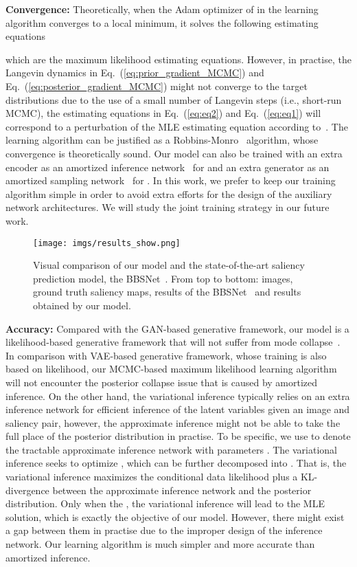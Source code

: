 \documentclass{article}
\begin{document}
\noindent\textbf{Convergence:} Theoretically, when the Adam optimizer of  in the learning algorithm converges to a local minimum, it solves the following estimating equations

which are the maximum likelihood estimating equations. However, in practise, the Langevin dynamics in Eq.~(\ref{eq:prior_gradient_MCMC}) and Eq.~(\ref{eq:posterior_gradient_MCMC}) might not converge to the target distributions due to the use of a small number of Langevin steps (i.e., short-run MCMC), the estimating equations in Eq.~(\ref{eq:eq2}) and Eq.~(\ref{eq:eq1}) will correspond to a perturbation of the MLE estimating equation according to~\cite{nijkamp2019learning,nijkamp2020learning,ebm_prior}. The learning algorithm can be justified as a Robbins-Monro~\cite{robbins1951stochastic} algorithm, whose convergence is theoretically sound. Our model can also be trained with an extra encoder as an amortized inference network~\cite{vae_bayes_kumar} for   and an extra generator as an amortized sampling network~\cite{XieLGW18,xie2018cooperative,XieZL21} for  . In this work, we prefer to keep our training algorithm simple in order to avoid extra efforts for the design of the auxiliary network architectures. We will study the joint training strategy in our future work.

 \begin{figure*}[t]
   \begin{center}
   \texttt{[image: imgs/results\_show.png]}
   \end{center}
   \caption{Visual comparison of our  model and the state-of-the-art saliency prediction model, the BBSNet~\cite{fan2020bbs}. From top to bottom: images, ground truth saliency maps, results of the BBSNet~\cite{fan2020bbs} and results obtained by our model.
   }\label{fig:visual_comparison}
\end{figure*}

\noindent\textbf{Accuracy:} Compared with the GAN-based generative framework, our model is a likelihood-based generative framework that will not suffer from mode collapse~\cite{AroraRZ18}. In comparison with VAE-based generative framework, whose training is also based on likelihood, our MCMC-based maximum likelihood learning algorithm will not encounter the posterior collapse issue that is caused by amortized inference. On the other hand, the variational inference typically relies on an extra inference network for efficient inference of the latent variables given an image and saliency pair, however, the approximate inference might not be able to take the full place of the posterior distribution in practise. To be specific, we use  to denote the tractable approximate inference network with parameters . The variational inference seeks to optimize
, which can be further decomposed into . That is, the variational inference maximizes the conditional data likelihood plus a KL-divergence between the approximate inference network and the posterior distribution. Only when the , the variational inference will lead to the MLE solution, which is exactly the objective of our model. However, there might exist a gap between them in practise due to the improper design of the inference network. Our learning algorithm is much simpler and more accurate than amortized inference.       
\end{document}
